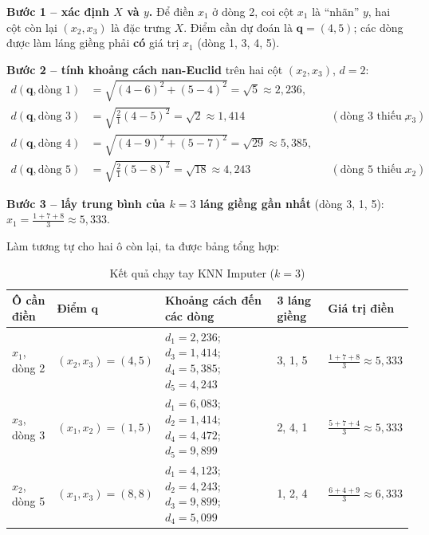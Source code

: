 \noindent\textbf{Bước 1 -- xác định $X$ và $y$.} Để điền $x_1$ ở dòng 2, coi cột $x_1$ là ``nhãn'' $y$, hai cột còn lại $(x_2, x_3)$ là đặc trưng $X$. Điểm cần dự đoán là $\mathbf{q} = (4, 5)$; các dòng được làm láng giềng phải \textbf{có} giá trị $x_1$ (dòng 1, 3, 4, 5).

\noindent\textbf{Bước 2 -- tính khoảng cách nan-Euclid} trên hai cột $(x_2, x_3)$, $d = 2$:
\begin{align*}
    d(\mathbf{q}, \text{dòng } 1) &= \sqrt{(4 - 6)^2 + (5 - 4)^2} = \sqrt{5} \approx 2{,}236, \\
    d(\mathbf{q}, \text{dòng } 3) &= \sqrt{\tfrac{2}{1}(4 - 5)^2} = \sqrt{2} \approx 1{,}414 && (\text{dòng 3 thiếu } x_3), \\
    d(\mathbf{q}, \text{dòng } 4) &= \sqrt{(4 - 9)^2 + (5 - 7)^2} = \sqrt{29} \approx 5{,}385, \\
    d(\mathbf{q}, \text{dòng } 5) &= \sqrt{\tfrac{2}{1}(5 - 8)^2} = \sqrt{18} \approx 4{,}243 && (\text{dòng 5 thiếu } x_2).
\end{align*}

\noindent\textbf{Bước 3 -- lấy trung bình của $k = 3$ láng giềng gần nhất} (dòng 3, 1, 5): $x_1 = \frac{1 + 7 + 8}{3} \approx 5{,}333$.

Làm tương tự cho hai ô còn lại, ta được bảng tổng hợp:

\begin{table}[H]
\centering
\small
\begin{tabular}{|p{1.6cm}|p{2.2cm}|p{4.7cm}|p{1.5cm}|p{2.5cm}|}
\hline
\textbf{Ô cần điền} & \textbf{Điểm $\mathbf{q}$} & \textbf{Khoảng cách đến các dòng} & \textbf{3 láng giềng} & \textbf{Giá trị điền} \\
\hline
$x_1$, dòng 2 & $(x_2, x_3) = (4, 5)$ & $d_1 = 2{,}236$; $d_3 = 1{,}414$; $d_4 = 5{,}385$; $d_5 = 4{,}243$ & 3, 1, 5 & $\frac{1 + 7 + 8}{3} \approx 5{,}333$ \\ \hline
$x_3$, dòng 3 & $(x_1, x_2) = (1, 5)$ & $d_1 = 6{,}083$; $d_2 = 1{,}414$; $d_4 = 4{,}472$; $d_5 = 9{,}899$ & 2, 4, 1 & $\frac{5 + 7 + 4}{3} \approx 5{,}333$ \\ \hline
$x_2$, dòng 5 & $(x_1, x_3) = (8, 8)$ & $d_1 = 4{,}123$; $d_2 = 4{,}243$; $d_3 = 9{,}899$; $d_4 = 5{,}099$ & 1, 2, 4 & $\frac{6 + 4 + 9}{3} \approx 6{,}333$ \\ \hline
\end{tabular}
\caption{Kết quả chạy tay KNN Imputer ($k = 3$)}
\label{tab:knn-impute-result}
\end{table}

